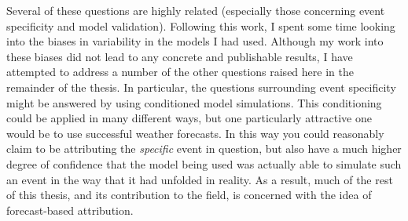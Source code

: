   Several of these questions are highly related (especially those concerning event specificity and model validation). Following this work, I spent some time looking into the biases in variability in the models I had used. Although my work into these biases did not lead to any concrete and publishable results, I have attempted to address a number of the other questions raised here in the remainder of the thesis. In particular, the questions surrounding event specificity might be answered by using conditioned model simulations. This conditioning could be applied in many different ways, but one particularly attractive one would be to use successful weather forecasts. In this way you could reasonably claim to be attributing the \emph{specific} event in question, but also have a much higher degree of confidence that the model being used was actually able to simulate such an event in the way that it had unfolded in reality. As a result, much of the rest of this thesis, and its contribution to the field, is concerned with the idea of forecast-based attribution.
